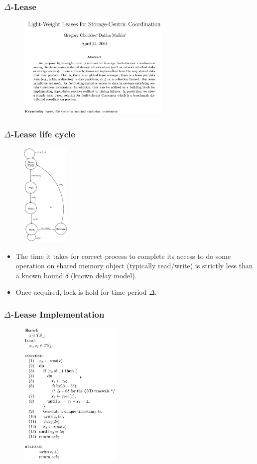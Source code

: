 \documentclass[10pt,utf8]{beamer}
\begin{document}
\begin{frame}
    \frametitle{$\Delta$-Lease}
    \begin{figure}
        \centering
        \includegraphics[height=5cm]{./img/delta-leases-paper.eps}
    \end{figure}
\end{frame}

\begin{frame}
    \frametitle{$\Delta$-Lease life cycle}
    \begin{figure}
        \centering
        \includegraphics[height=5cm]{./img/delta-lease-life-cycle.eps}
    \end{figure}
    
    \centering
    \begin{itemize}
     \item The time it takes for correct process to complete its access to do some operation on shared memory object (typically read/write) is strictly less than a known bound $\delta$ (known delay model).
     \item Once acquired, lock is hold for time period $\Delta$.
    \end{itemize}
\end{frame}

\begin{frame}
    \frametitle{$\Delta$-Lease Implementation}
    \begin{figure}
        \centering
        \includegraphics[height=7cm]{./img/delta-lease-alg.eps}
    \end{figure}
\end{frame}
\end{document}
